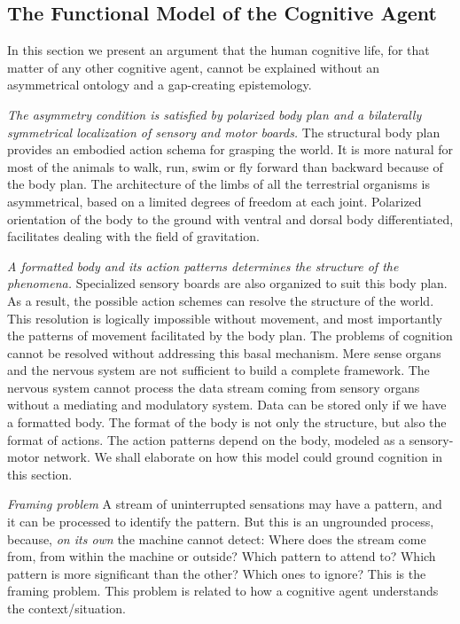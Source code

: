 \subsection{The Functional Model of the Cognitive Agent}

In this section we present an argument that the human cognitive life, for that matter of any other cognitive agent, cannot be explained without an asymmetrical ontology and a gap-creating epistemology.  

\emph{The asymmetry condition is satisfied by polarized body plan and a bilaterally symmetrical localization of sensory and motor boards.}  
The structural body plan provides an embodied action schema for grasping the world. It is more natural for most of the animals to walk, run, swim or fly forward than backward because of the body plan. The architecture of the limbs of all the terrestrial organisms is asymmetrical, based on a limited degrees of freedom at each joint. Polarized orientation of the body to the ground with ventral and dorsal body differentiated, facilitates dealing with the field of gravitation. 

\emph{A formatted body and its action patterns determines the structure of the phenomena.} Specialized sensory boards are also organized to suit this body plan. As a result, the possible action schemes can resolve the structure of the world. This resolution is logically impossible without movement, and most importantly the patterns of movement facilitated by the body plan. The problems of cognition cannot be resolved without addressing this basal mechanism. Mere sense organs and the nervous system are not sufficient to build a complete framework. The nervous system cannot process the data stream coming from sensory organs without a mediating and modulatory system. Data can be stored only if we have a formatted body. The format of the body is not only the structure, but also the format of actions. The action patterns depend on the body, modeled as a sensory-motor network.  We shall elaborate on how this model could ground cognition in this section.

\emph{Framing problem} A stream of uninterrupted sensations may have a pattern, and it can be processed to identify the pattern. But this is an ungrounded process, because, \textit{on its own} the machine cannot detect: Where does the stream come from, from within the machine or outside? Which pattern to attend to? Which pattern is more significant than the other? Which ones to ignore? This is the framing problem. This problem is related to how a cognitive agent understands the context/situation. 

